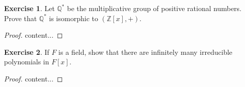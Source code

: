\documentclass{article}
\theoremstyle{definition}
\newtheorem{theorem}{Exercise}[section]
\theoremstyle{plain}
\newcommand{\Z}{\mathbb{Z}}
\newcommand{\Q}{\mathbb{Q}}
\begin{document}
	\setcounter{theorem}{18}
	\begin{theorem}
		Let $\Q^*$ be the multiplicative group of positive rational numbers. Prove that $\Q^*$ is isomorphic to $\left( \Z[x], +\right)$.
	\end{theorem}
	\begin{proof}
		content...
	\end{proof}
	
	\setcounter{theorem}{20}
	\begin{theorem}
		If $F$ is a field, show that there are infinitely many irreducible polynomials in $F[x]$. 
	\end{theorem}
	\begin{proof}
		content...
	\end{proof}
	
	
\end{document}
